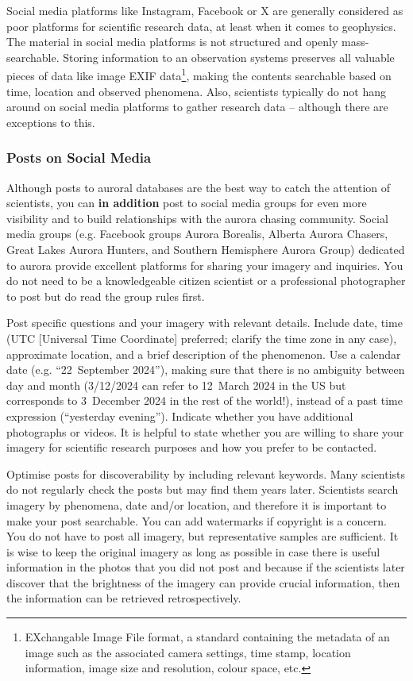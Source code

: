 \documentclass{article}
\begin{document}
Social media platforms like Instagram, Facebook or X are generally considered as poor platforms for scientific research data, at least when it comes to geophysics. The material in social media platforms is not structured and openly mass-searchable. Storing information to an observation systems preserves all valuable pieces of data like image EXIF data\footnote{EXchangable Image File format, a standard containing the metadata of an image such as the associated camera settings, time stamp, location information, image size and resolution, colour space, etc.}, making the contents searchable based on time, location and observed phenomena. Also, scientists typically do not hang around on social media platforms to gather research data -- although there are exceptions to this.

\subsubsection{Posts on Social Media}


Although posts to auroral databases are the best way to catch the attention of scientists, you can \textbf{in addition} post to social media groups for even more visibility and to build relationships with the aurora chasing community.
Social media groups (e.g. Facebook groups Aurora Borealis, Alberta Aurora Chasers, Great Lakes Aurora Hunters, and Southern Hemisphere Aurora Group) dedicated to aurora provide excellent platforms for sharing your imagery and inquiries. You do not need to be a knowledgeable citizen scientist or a professional photographer to post but do read the group rules first.

Post specific questions and your imagery with relevant details. Include date, time (UTC [Universal Time Coordinate] preferred; clarify the time zone in any case), approximate location, and a brief description of the phenomenon. Use a calendar date (e.g. ``22~September 2024''), making sure that there is no ambiguity between day and month (3/12/2024 can refer to 12~March 2024 in the US but corresponds to 3~December 2024 in the rest of the world!), instead of a past time expression (``yesterday evening''). Indicate whether you have additional photographs or videos. It is helpful to state whether you are willing to share your imagery for scientific research purposes and how you prefer to be contacted. 
 
Optimise posts for discoverability by including relevant keywords. Many scientists do not regularly check the posts but may find them years later. Scientists search imagery by phenomena, date and/or location, and therefore it is important to make your post searchable. You can add watermarks if copyright is a concern. You do not have to post all imagery, but representative samples are sufficient. It is wise to keep the original imagery as long as possible in case there is useful information in the photos that you did not post and because if the scientists later discover that the brightness of the imagery can provide crucial information, then the information can be retrieved retrospectively.
\end{document}

